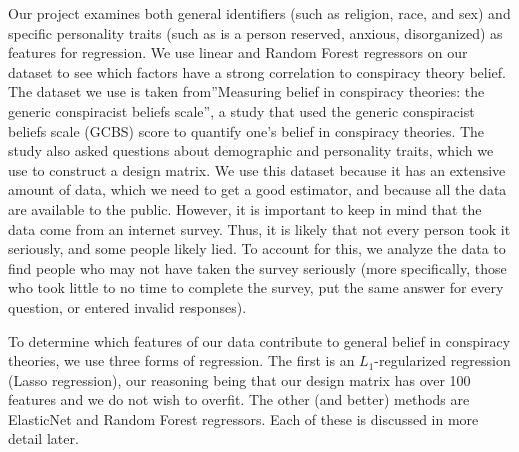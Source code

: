 \documentclass[11pt]{article}
\begin{document}
Our project examines both general identifiers (such as religion,
race, and sex) and specific personality traits (such as is a person
reserved, anxious, disorganized) as features for regression. We use linear and Random Forest regressors on our dataset to see which factors have a
strong correlation to conspiracy theory belief. The dataset we use is
taken from''Measuring belief in conspiracy theories: the generic
conspiracist beliefs scale'', a study that used the generic
conspiracist beliefs scale (GCBS) score to quantify one's belief in
conspiracy theories. The study also asked questions about demographic
and personality traits, which we use to construct a design matrix. We
use this dataset because it has an extensive amount of data, which we
need to get a good estimator, and because all the data are available
to the public. However, it is important to keep in mind that the data
come from an internet survey. Thus, it is likely that not every person
took it seriously, and some people likely lied. To account for this, we
analyze the data to find people who may not have taken the survey
seriously (more specifically, those who took little to no time to complete the survey, put the same
answer for every question, or entered invalid responses). 

To determine which features of our data contribute to general belief in conspiracy theories, we use three forms of regression. The first is an $L_1$-regularized regression (Lasso regression), our reasoning being that our design matrix has over 100 features and we do not wish to overfit. The other (and better) methods are ElasticNet and Random Forest regressors. Each of these is discussed in more detail later. 
\end{document}
